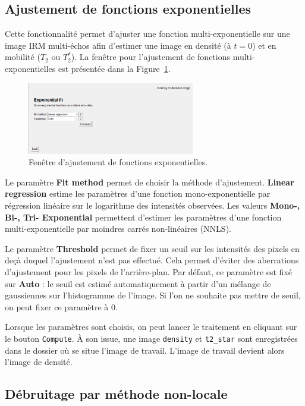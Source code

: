 \documentclass[french]{article}
\begin{document}
\subsection{Ajustement de fonctions exponentielles}

Cette fonctionnalité permet
d'ajuster une fonction multi-exponentielle sur une image IRM
multi-échos afin d'estimer une image en densité (à $t = 0$) et en
mobilité ($T_2$ ou $T_2^*$). La fenêtre pour l'ajustement de fonctions multi-exponentielles est
présentée dans la Figure~\ref{fig:expfit}. 

\begin{figure}[ht]
  \centering \includegraphics[width=0.65\textwidth]{fig/expfit}
  \caption{Fenêtre d'ajustement de fonctions exponentielles.}
  \label{fig:expfit}
\end{figure}



Le paramètre \textbf{Fit method} permet de choisir la méthode
d'ajustement. \textbf{Linear regression} estime les paramètres d'une
fonction mono-exponentielle par régression linéaire sur le logarithme
des intensités observées. Les valeurs \textbf{Mono-, Bi-, Tri- Exponential}
permettent d'estimer les paramètres d'une fonction multi-exponentielle par
moindres carrés non-linéaires (NNLS).

Le paramètre \textbf{Threshold} permet de fixer un seuil sur les
intensités des pixels en deçà duquel l'ajustement n'est pas effectué.
Cela permet d'éviter des aberrations d'ajustement pour les pixels de
l'arrière-plan. Par défaut, ce paramètre est fixé sur \textbf{Auto} :
le seuil est estimé automatiquement à partir d'un mélange de
gaussiennes sur l'histogramme de l'image. Si l'on ne souhaite pas
mettre de seuil, on peut fixer ce paramètre à 0. 

Lorsque les paramètres sont choisis, on peut lancer le traitement en
cliquant sur le bouton \texttt{Compute}. À son issue, une image \texttt{density} et
\texttt{t2\_star} sont enregistrées dans le dossier où se
situe l'image de travail. L'image de travail devient alors l'image de
densité.

\subsection{Débruitage par méthode non-locale}
\label{sec:debr-par-meth}
\end{document}
